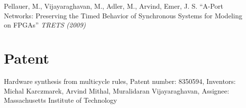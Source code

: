\documentclass[margin,line]{resume}
\begin{document}
\begin{resume}
    \vspace{-2mm}
    Pellauer, M., {Vijayaraghavan, M.}, Adler, M., Arvind, Emer, J. S.
    ``A-Port Networks: Preserving the Timed Behavior of Synchronous Systems for
    Modeling on FPGAs'' \textit{TRETS (2009)}

	\section{\mysidestyle Patent}
	Hardware synthesis from multicycle rules, Patent number: 8350594, Inventors: Michal Karczmarek, Arvind Mithal, Muralidaran Vijayaraghavan, Assignee: Massachusetts Institute of Technology


\end{resume}
\end{document}
